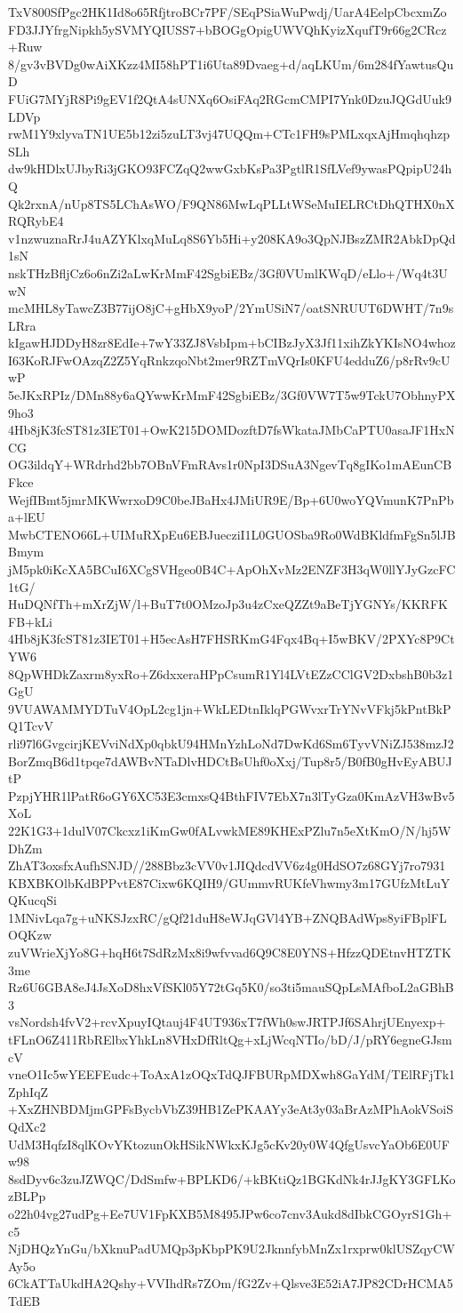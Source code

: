 TxV800SfPgc2HK1Id8o65RfjtroBCr7PF/SEqPSiaWuPwdj/UarA4EelpCbcxmZo
FD3JJYfrgNipkh5ySVMYQIUSS7+bBOGgOpigUWVQhKyizXqufT9r66g2CRcz+Ruw
8/gv3vBVDg0wAiXKzz4MI58hPT1i6Uta89Dvaeg+d/aqLKUm/6m284fYawtusQuD
FUiG7MYjR8Pi9gEV1f2QtA4sUNXq6OsiFAq2RGcmCMPI7Ynk0DzuJQGdUuk9LDVp
rwM1Y9xlyvaTN1UE5b12zi5zuLT3vj47UQQm+CTc1FH9sPMLxqxAjHmqhqhzpSLh
dw9kHDlxUJbyRi3jGKO93FCZqQ2wwGxbKsPa3PgtlR1SfLVef9ywasPQpipU24hQ
Qk2rxnA/nUp8TS5LChAsWO/F9QN86MwLqPLLtWSeMuIELRCtDhQTHX0nXRQRybE4
v1nzwuznaRrJ4uAZYKlxqMuLq8S6Yb5Hi+y208KA9o3QpNJBszZMR2AbkDpQd1sN
nskTHzBfljCz6o6nZi2aLwKrMmF42SgbiEBz/3Gf0VUmlKWqD/eLlo+/Wq4t3UwN
mcMHL8yTawcZ3B77ijO8jC+gHbX9yoP/2YmUSiN7/oatSNRUUT6DWHT/7n9sLRra
kIgawHJDDyH8zr8EdIe+7wY33ZJ8VsbIpm+bCIBzJyX3Jf11xihZkYKIsNO4whoz
I63KoRJFwOAzqZ2Z5YqRnkzqoNbt2mer9RZTmVQrIs0KFU4edduZ6/p8rRv9cUwP
5eJKxRPIz/DMn88y6aQYwwKrMmF42SgbiEBz/3Gf0VW7T5w9TckU7ObhnyPX9ho3
4Hb8jK3fcST81z3IET01+OwK215DOMDozftD7fsWkataJMbCaPTU0asaJF1HxNCG
OG3ildqY+WRdrhd2bb7OBnVFmRAvs1r0NpI3DSuA3NgevTq8gIKo1mAEunCBFkce
WejfIBmt5jmrMKWwrxoD9C0beJBaHx4JMiUR9E/Bp+6U0woYQVmunK7PnPba+lEU
MwbCTENO66L+UIMuRXpEu6EBJuecziI1L0GUOSba9Ro0WdBKldfmFgSn5lJBBmym
jM5pk0iKcXA5BCuI6XCgSVHgeo0B4C+ApOhXvMz2ENZF3H3qW0llYJyGzcFC1tG/
HuDQNfTh+mXrZjW/l+BuT7t0OMzoJp3u4zCxeQZZt9aBeTjYGNYs/KKRFKFB+kLi
4Hb8jK3fcST81z3IET01+H5ecAsH7FHSRKmG4Fqx4Bq+I5wBKV/2PXYc8P9CtYW6
8QpWHDkZaxrm8yxRo+Z6dxxeraHPpCsumR1Yl4LVtEZzCClGV2DxbshB0b3z1GgU
9VUAWAMMYDTuV4OpL2cg1jn+WkLEDtnIklqPGWvxrTrYNvVFkj5kPntBkPQ1TcvV
rli97l6GvgcirjKEVviNdXp0qbkU94HMnYzhLoNd7DwKd6Sm6TyvVNiZJ538mzJ2
BorZmqB6d1tpqe7dAWBvNTaDlvHDCtBsUhf0oXxj/Tup8r5/B0fB0gHvEyABUJtP
PzpjYHR1lPatR6oGY6XC53E3cmxsQ4BthFIV7EbX7n3lTyGza0KmAzVH3wBv5XoL
22K1G3+1dulV07Ckcxz1iKmGw0fALvwkME89KHExPZlu7n5eXtKmO/N/hj5WDhZm
ZhAT3oxsfxAufhSNJD//288Bbz3cVV0v1JIQdcdVV6z4g0HdSO7z68GYj7ro7931
KBXBKOlbKdBPPvtE87Cixw6KQIH9/GUmmvRUKfeVhwmy3m17GUfzMtLuYQKucqSi
1MNivLqa7g+uNKSJzxRC/gQf21duH8eWJqGVl4YB+ZNQBAdWps8yiFBplFLOQKzw
zuVWrieXjYo8G+hqH6t7SdRzMx8i9wfvvad6Q9C8E0YNS+HfzzQDEtnvHTZTK3me
Rz6U6GBA8eJ4JsXoD8hxVfSKl05Y72tGq5K0/so3ti5mauSQpLsMAfboL2aGBhB3
vsNordsh4fvV2+rcvXpuyIQtauj4F4UT936xT7fWh0swJRTPJf6SAhrjUEnyexp+
tFLnO6Z411RbRElbxYhkLn8VHxDfRltQg+xLjWcqNTIo/bD/J/pRY6egneGJsmcV
vneO1Ic5wYEEFEudc+ToAxA1zOQxTdQJFBURpMDXwh8GaYdM/TElRFjTk1ZphIqZ
+XxZHNBDMjmGPFsBycbVbZ39HB1ZePKAAYy3eAt3y03aBrAzMPhAokVSoiSQdXc2
UdM3HqfzI8qlKOvYKtozunOkHSikNWkxKJg5cKv20y0W4QfgUsvcYaOb6E0UFw98
8sdDyv6c3zuJZWQC/DdSmfw+BPLKD6/+kBKtiQz1BGKdNk4rJJgKY3GFLKozBLPp
o22h04vg27udPg+Ee7UV1FpKXB5M8495JPw6co7cnv3Aukd8dIbkCGOyrS1Gh+c5
NjDHQzYnGu/bXknuPadUMQp3pKbpPK9U2JknnfybMnZx1rxprw0klUSZqyCWAy5o
6CkATTaUkdHA2Qshy+VVIhdRs7ZOm/fG2Zv+Qlsve3E52iA7JP82CDrHCMA5TdEB
